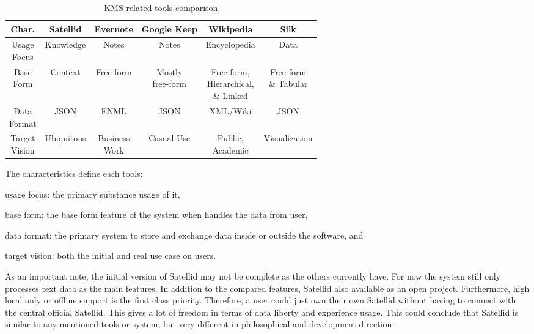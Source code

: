 \begin{table}[h!]
\centering
\begin{tabular}{ |c||c|c|c|c|c| }
\hline
Char.  & Satellid   & Evernote      & Google Keep & Wikipedia    & Silk \\ \hline
\hline
\shortstack{Usage\\Focus} & Knowledge  & Notes         & Notes       & Encyclopedia & Data \\ \hline
\shortstack{Base\\Form}   & Context    & Free-form     & \shortstack{Mostly\\free-form} & \shortstack{Free-form,\\Hierarchical,\\\& Linked} & \shortstack{Free-form\\\& Tabular} \\ \hline
\shortstack{Data\\Format} & JSON       & ENML          & JSON        & XML/Wiki     & JSON \\ \hline
\shortstack{Target\\Vision} & Ubiquitous & \shortstack{Business\\Work} & Casual Use  & \shortstack{Public,\\Academic} & Visualization \\
\hline
\end{tabular}
\caption{KMS-related tools comparison}
\label{table:kms-comparison}
\end{table}

The characteristics define each tools:
\begin{inparaenum}[\itshape 1\upshape)]
\item usage focus: the primary substance usage of it,
\item base form: the base form feature of the system when handles the data from user,
\item data format: the primary system to store and exchange data inside or outside the software, and
\item target vision: both the initial and real use case on users.
\end{inparaenum}
As an important note, the initial version of Satellid may not be complete as the others currently have.
For now the system still only processes text data as the main features.
In addition to the compared features, Satellid also available as an open project.
Furthermore, high local only or offline support is the first class priority.
Therefore, a user could just own their own Satellid without having to connect with the central official Satellid.
This gives a lot of freedom in terms of data liberty and experience usage.
This could conclude that Satellid is similar to any mentioned tools or system, but very different in philosophical and development direction.
